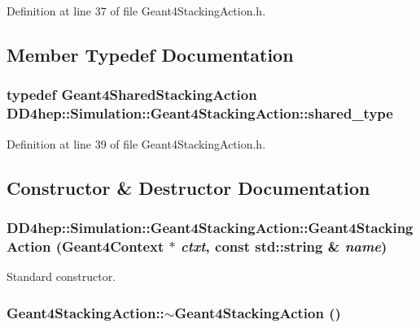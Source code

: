 Definition at line 37 of file Geant4StackingAction.h.

\subsection{Member Typedef Documentation}
\hypertarget{class_d_d4hep_1_1_simulation_1_1_geant4_stacking_action_a7cb1de3eaba3df79df86318e664968e4}{
\subsubsection[{shared\_\-type}]{\setlength{\rightskip}{0pt plus 5cm}typedef {\bf Geant4SharedStackingAction} {\bf DD4hep::Simulation::Geant4StackingAction::shared\_\-type}}}
\label{class_d_d4hep_1_1_simulation_1_1_geant4_stacking_action_a7cb1de3eaba3df79df86318e664968e4}


Definition at line 39 of file Geant4StackingAction.h.

\subsection{Constructor \& Destructor Documentation}
\hypertarget{class_d_d4hep_1_1_simulation_1_1_geant4_stacking_action_a37e43c47abe5ab2fa6f45ffad46fc942}{
\subsubsection[{Geant4StackingAction}]{\setlength{\rightskip}{0pt plus 5cm}DD4hep::Simulation::Geant4StackingAction::Geant4StackingAction ({\bf Geant4Context} $\ast$ {\em ctxt}, \/  const std::string \& {\em name})}}
\label{class_d_d4hep_1_1_simulation_1_1_geant4_stacking_action_a37e43c47abe5ab2fa6f45ffad46fc942}


Standard constructor. \hypertarget{class_d_d4hep_1_1_simulation_1_1_geant4_stacking_action_a15dd317e760306d51e728b26aebf65a7}{
\subsubsection[{$\sim$Geant4StackingAction}]{\setlength{\rightskip}{0pt plus 5cm}Geant4StackingAction::$\sim$Geant4StackingAction ()}}
\label{class_d_d4hep_1_1_simulation_1_1_geant4_stacking_action_a15dd317e760306d51e728b26aebf65a7}


